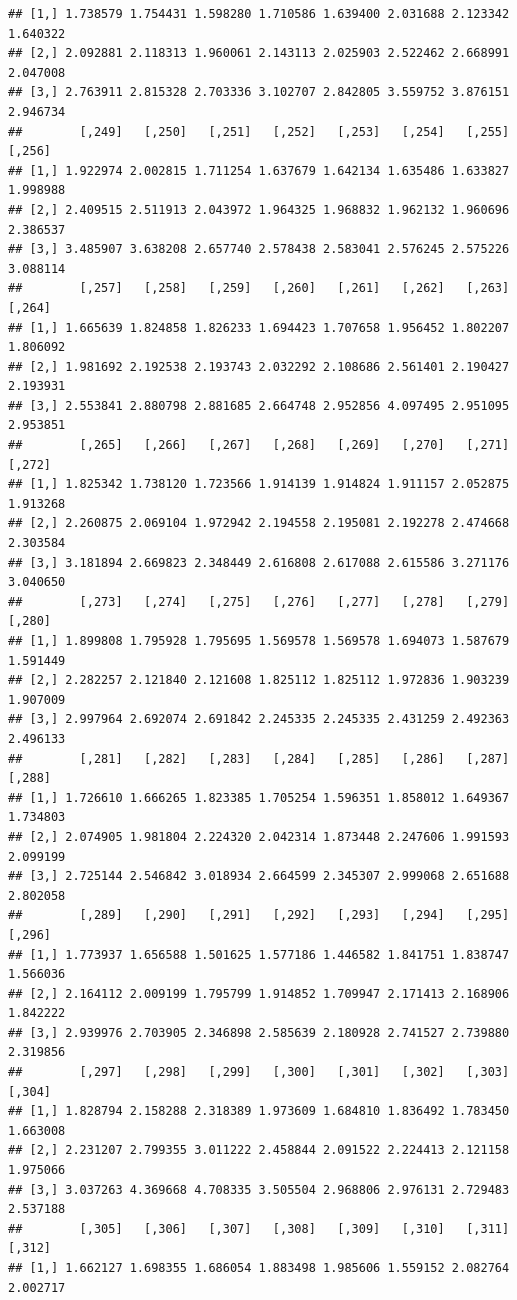 \documentclass[article]{jss}\usepackage[]{graphicx}\usepackage[]{xcolor}
\makeatletter
\newenvironment{kframe}{%
 \def\at@end@of@kframe{}%
 \ifinner\ifhmode%
  \def\at@end@of@kframe{\end{minipage}}%
  \begin{minipage}{\columnwidth}%
 \fi\fi%
 \def\FrameCommand##1{\hskip\@totalleftmargin \hskip-\fboxsep
 \colorbox{shadecolor}{##1}\hskip-\fboxsep
     \hskip-\linewidth \hskip-\@totalleftmargin \hskip\columnwidth}%
 \MakeFramed {\advance\hsize-\width
   \@totalleftmargin\z@ \linewidth\hsize
   \@setminipage}}%
 {\par\unskip\endMakeFramed%
 \at@end@of@kframe}
\newenvironment{knitrout}{}{} %
\makeatother
\begin{document}
\begin{knitrout}
\begin{kframe}
\begin{verbatim}
## [1,] 1.738579 1.754431 1.598280 1.710586 1.639400 2.031688 2.123342 1.640322
## [2,] 2.092881 2.118313 1.960061 2.143113 2.025903 2.522462 2.668991 2.047008
## [3,] 2.763911 2.815328 2.703336 3.102707 2.842805 3.559752 3.876151 2.946734
##        [,249]   [,250]   [,251]   [,252]   [,253]   [,254]   [,255]   [,256]
## [1,] 1.922974 2.002815 1.711254 1.637679 1.642134 1.635486 1.633827 1.998988
## [2,] 2.409515 2.511913 2.043972 1.964325 1.968832 1.962132 1.960696 2.386537
## [3,] 3.485907 3.638208 2.657740 2.578438 2.583041 2.576245 2.575226 3.088114
##        [,257]   [,258]   [,259]   [,260]   [,261]   [,262]   [,263]   [,264]
## [1,] 1.665639 1.824858 1.826233 1.694423 1.707658 1.956452 1.802207 1.806092
## [2,] 1.981692 2.192538 2.193743 2.032292 2.108686 2.561401 2.190427 2.193931
## [3,] 2.553841 2.880798 2.881685 2.664748 2.952856 4.097495 2.951095 2.953851
##        [,265]   [,266]   [,267]   [,268]   [,269]   [,270]   [,271]   [,272]
## [1,] 1.825342 1.738120 1.723566 1.914139 1.914824 1.911157 2.052875 1.913268
## [2,] 2.260875 2.069104 1.972942 2.194558 2.195081 2.192278 2.474668 2.303584
## [3,] 3.181894 2.669823 2.348449 2.616808 2.617088 2.615586 3.271176 3.040650
##        [,273]   [,274]   [,275]   [,276]   [,277]   [,278]   [,279]   [,280]
## [1,] 1.899808 1.795928 1.795695 1.569578 1.569578 1.694073 1.587679 1.591449
## [2,] 2.282257 2.121840 2.121608 1.825112 1.825112 1.972836 1.903239 1.907009
## [3,] 2.997964 2.692074 2.691842 2.245335 2.245335 2.431259 2.492363 2.496133
##        [,281]   [,282]   [,283]   [,284]   [,285]   [,286]   [,287]   [,288]
## [1,] 1.726610 1.666265 1.823385 1.705254 1.596351 1.858012 1.649367 1.734803
## [2,] 2.074905 1.981804 2.224320 2.042314 1.873448 2.247606 1.991593 2.099199
## [3,] 2.725144 2.546842 3.018934 2.664599 2.345307 2.999068 2.651688 2.802058
##        [,289]   [,290]   [,291]   [,292]   [,293]   [,294]   [,295]   [,296]
## [1,] 1.773937 1.656588 1.501625 1.577186 1.446582 1.841751 1.838747 1.566036
## [2,] 2.164112 2.009199 1.795799 1.914852 1.709947 2.171413 2.168906 1.842222
## [3,] 2.939976 2.703905 2.346898 2.585639 2.180928 2.741527 2.739880 2.319856
##        [,297]   [,298]   [,299]   [,300]   [,301]   [,302]   [,303]   [,304]
## [1,] 1.828794 2.158288 2.318389 1.973609 1.684810 1.836492 1.783450 1.663008
## [2,] 2.231207 2.799355 3.011222 2.458844 2.091522 2.224413 2.121158 1.975066
## [3,] 3.037263 4.369668 4.708335 3.505504 2.968806 2.976131 2.729483 2.537188
##        [,305]   [,306]   [,307]   [,308]   [,309]   [,310]   [,311]   [,312]
## [1,] 1.662127 1.698355 1.686054 1.883498 1.985606 1.559152 2.082764 2.002717

\end{verbatim}
\end{kframe}
\end{knitrout}
\end{document}
